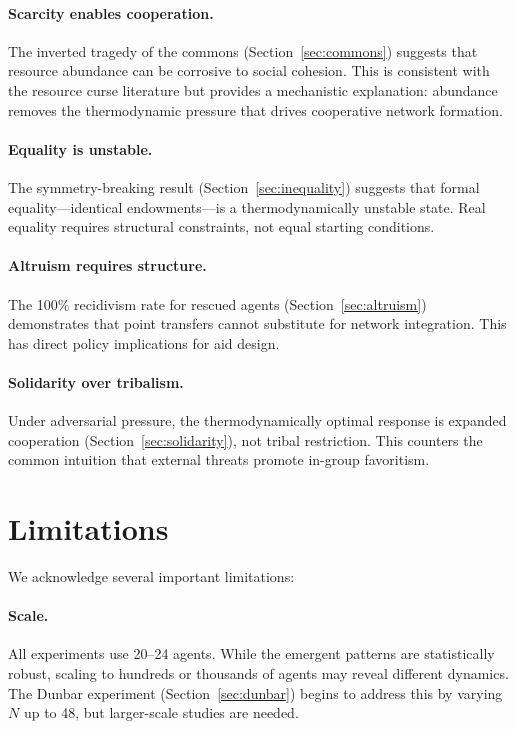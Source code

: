 \documentclass[12pt,a4paper]{article}
\begin{document}
\paragraph{Scarcity enables cooperation.} The inverted tragedy of the commons (Section~\ref{sec:commons}) suggests that resource abundance can be corrosive to social cohesion. This is consistent with the resource curse literature \citep{ross2015} but provides a mechanistic explanation: abundance removes the thermodynamic pressure that drives cooperative network formation.

\paragraph{Equality is unstable.} The symmetry-breaking result (Section~\ref{sec:inequality}) suggests that formal equality---identical endowments---is a thermodynamically unstable state. Real equality requires structural constraints, not equal starting conditions.

\paragraph{Altruism requires structure.} The 100\% recidivism rate for rescued agents (Section~\ref{sec:altruism}) demonstrates that point transfers cannot substitute for network integration. This has direct policy implications for aid design.

\paragraph{Solidarity over tribalism.} Under adversarial pressure, the thermodynamically optimal response is expanded cooperation (Section~\ref{sec:solidarity}), not tribal restriction. This counters the common intuition that external threats promote in-group favoritism.

\section{Limitations}
\label{sec:limitations}

We acknowledge several important limitations:

\paragraph{Scale.} All experiments use 20--24 agents. While the emergent patterns are statistically robust, scaling to hundreds or thousands of agents may reveal different dynamics. The Dunbar experiment (Section~\ref{sec:dunbar}) begins to address this by varying $N$ up to 48, but larger-scale studies are needed.
\end{document}
